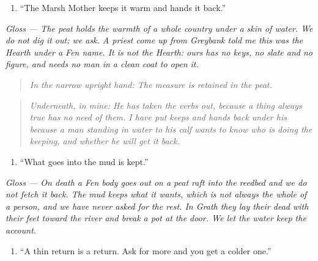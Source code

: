 \documentclass{design/chronicle}
\begin{document}
\begin{enumerate}[leftmargin=1.4em,itemsep=1pt,topsep=3pt,parsep=0pt]

\item “The Marsh Mother keeps it warm and hands it back.”

\end{enumerate}

\emph{Gloss — The peat holds the warmth of a whole country under a skin of water. We do not dig it out; we ask. A priest come up from Greybank told me this was the Hearth under a Fen name. It is not the Hearth: ours has no keys, no slate and no figure, and needs no man in a clean coat to open it.}

\begin{quote}\itshape \emph{In the narrow upright hand:} The measure is retained in the peat.\end{quote}

\begin{quote}\itshape *\end{quote}

\begin{quote}\itshape \emph{Underneath, in mine:} He has taken the verbs out, because a thing always true has no need of them. I have put \emph{keeps} and \emph{hands back} under his because a man standing in water to his calf wants to know who is doing the keeping, and whether he will get it back.\end{quote}

\begin{enumerate}[leftmargin=1.4em,itemsep=1pt,topsep=3pt,parsep=0pt]

\item “What goes into the mud is kept.”

\end{enumerate}

\emph{Gloss — On death a Fen body goes out on a peat raft into the reedbed and we do not fetch it back. The mud keeps what it wants, which is not always the whole of a person, and we have never asked for the rest. In Grath they lay their dead with their feet toward the river and break a pot at the door. We let the water keep the account.}

\begin{enumerate}[leftmargin=1.4em,itemsep=1pt,topsep=3pt,parsep=0pt]

\item “A thin return is a return. Ask for more and you get a colder one.”

\end{enumerate}
\end{document}
